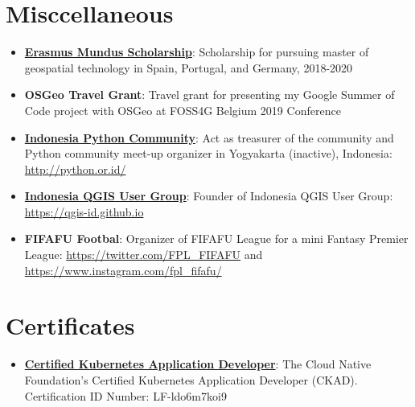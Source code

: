 \documentclass[letterpaper,11pt]{article}
\newcommand{\resumeItem}[2]{
  \item\small{
    \textbf{#1}{: #2 \vspace{-2pt}}
  }
}
\newcommand{\resumeSubItem}[2]{\resumeItem{#1}{#2}\vspace{-4pt}}
\newcommand{\resumeSubHeadingListStart}{\begin{itemize}[leftmargin=*]}
\newcommand{\resumeSubHeadingListEnd}{\end{itemize}}
\begin{document}
\section{Misccellaneous}
  \resumeSubHeadingListStart
    \resumeSubItem{\href{http://mastergeotech.info/}{Erasmus Mundus Scholarship}}
      {Scholarship for pursuing master of geospatial technology in Spain, Portugal, and Germany, 2018-2020}
    \resumeSubItem{OSGeo Travel Grant}
      {Travel grant for presenting my Google Summer of Code project with OSGeo at FOSS4G Belgium 2019 Conference}
    \resumeSubItem{\href{http://python.or.id/}{Indonesia Python Community}}
      {Act as treasurer of the community and Python community meet-up organizer in Yogyakarta (inactive), Indonesia: \url{http://python.or.id/}}
    \resumeSubItem{\href{https://qgis-id.github.io}{Indonesia QGIS User Group}}
      {Founder of Indonesia QGIS User Group: \url{https://qgis-id.github.io}}
    \resumeSubItem{FIFAFU Footbal}
      {Organizer of FIFAFU League for a mini Fantasy Premier League: \url{https://twitter.com/FPL_FIFAFU} and \url{https://www.instagram.com/fpl_fifafu/}}
  \resumeSubHeadingListEnd

 \section{Certificates}
  \resumeSubHeadingListStart
    \resumeSubItem{\href{http://mastergeotech.info/}{Certified Kubernetes Application Developer}}
      {The Cloud Native Foundation's Certified Kubernetes Application Developer (CKAD). Certification ID Number: LF-ldo6m7koi9}
  \resumeSubHeadingListEnd



\end{document}
